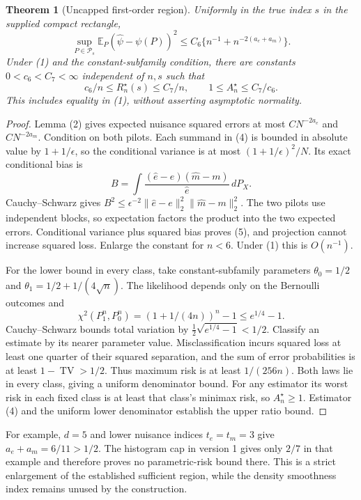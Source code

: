 \documentclass[11pt]{article}
\newtheorem{theorem}{Theorem}
\theoremstyle{remark}
\newcommand{\E}{\mathbb E}
\begin{document}
\begin{theorem}[Uncapped first-order region]
Uniformly in the true index $s$ in the supplied compact rectangle,
\[
 \sup_{P\in\mathcal P_s}\E_P(\widehat\psi-\psi(P))^2
 \le C_6\{n^{-1}+n^{-2(a_e+a_m)}\}.                  \tag{5}
\]
Under (1) and the constant-subfamily condition, there are constants
$0<c_6<C_7<\infty$ independent of $n,s$ such that
\[
 c_6/n\le R_n^\star(s)\le C_7/n,
 \qquad 1\le A_n^\star\le C_7/c_6.
\]
This includes equality in (1), without asserting asymptotic normality.
\end{theorem}
\begin{proof}
Lemma (2) gives expected nuisance squared errors at most
$C N^{-2a_e}$ and $C N^{-2a_m}$. Condition on both pilots.
Each summand in (4) is bounded in absolute value by $1+1/\epsilon$,
so the conditional variance is at most $(1+1/\epsilon)^2/N$.
Its exact conditional bias is
\[
 B=\int\frac{(\widehat e-e)(\widehat m-m)}{\widehat e}\,dP_X.
\]
Cauchy--Schwarz gives
$B^2\le\epsilon^{-2}\|\widehat e-e\|_2^2\|\widehat m-m\|_2^2$.
The two pilots use independent blocks, so expectation factors the
product into the two expected errors. Conditional variance plus squared
bias proves (5), and projection cannot increase squared loss. Enlarge the
constant for $n<6$. Under (1) this is $O(n^{-1})$.

For the lower bound in every class, take constant-subfamily parameters
$\theta_0=1/2$ and $\theta_1=1/2+1/(4\sqrt n)$. The likelihood depends
only on the Bernoulli outcomes and
\[
 \chi^2(P_1^n,P_0^n)=(1+1/(4n))^n-1\le e^{1/4}-1.
\]
Cauchy--Schwarz bounds total variation by
$\tfrac12\sqrt{e^{1/4}-1}<1/2$. Classify an estimate by its nearer
parameter value. Misclassification incurs squared loss at least one
quarter of their squared separation, and the sum of error probabilities
is at least $1-\operatorname{TV}>1/2$. Thus maximum risk is at least
$1/(256n)$. Both laws lie in every class, giving a uniform denominator
bound. For any estimator its worst risk in each fixed class is at least
that class's minimax risk, so $A_n^\star\ge1$. Estimator (4) and the
uniform lower denominator establish the upper ratio bound.
\end{proof}

For example, $d=5$ and lower nuisance indices $t_e=t_m=3$ give
$a_e+a_m=6/11>1/2$. The histogram cap in version 1 gives only $2/7$
in that example and therefore proves no parametric-risk bound there.
This is a strict enlargement of the established sufficient region, while
the density smoothness index remains unused by the construction.
\end{document}
